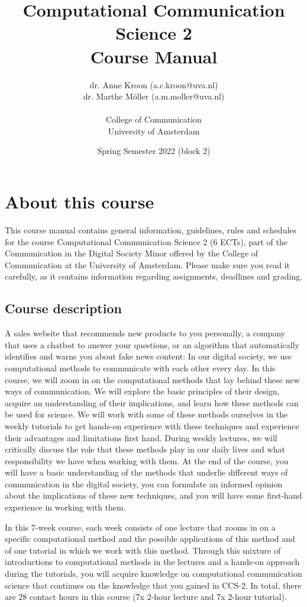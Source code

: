 \documentclass[a4paper,10pt,twocolumn]{report}
\title{Computational Communication Science 2\\ Course Manual}
\author{dr. Anne Kroon (a.c.kroon@uva.nl)\\dr. Marthe Möller (a.m.moller@uva.nl) \\~\\College of Communication\\University of Amsterdam}
\date{Spring Semester 2022 (block 2)}
\begin{document}
	\maketitle
	
	\tableofcontents

	
	\chapter{About this course}
	
	This course manual contains general information, guidelines, rules and schedules for the course Computational Communication Science 2 (6 ECTs), part of the Communication in the Digital Society Minor offered by the College of Communication at the University of Amsterdam. Please make sure you read it carefully, as it  contains information regarding assignments, deadlines and grading.
	
	\section{Course description}
	
	A sales website that recommends new products to you personally, a company that uses a chatbot to answer your questions, or an algorithm that automatically identifies and warns you about fake news content: In our digital society, we use computational methods to communicate with each other every day. In this course, we will zoom in on the computational methods that lay behind these new ways of communication. We will explore the basic principles of their design, acquire an understanding of their implications, and learn how these methods can be used for science. We will work with some of these methods ourselves in the weekly tutorials to get hands-on experience with these techniques and experience their advantages and limitations first hand. During weekly lectures, we will critically discuss the role that these methods play in our daily lives and what responsibility we have when working with them. At the end of the course, you will have a basic understanding of the methods that underlie different ways of communication in the digital society, you can formulate an informed opinion about the implications of these new techniques, and you will have some first-hand experience in working with them.
	
	In this 7-week course, each week consists of one lecture that zooms in on a specific computational method and the possible applications of this method and of one tutorial in which we work with this method. Through this mixture of introductions to computational methods in the lectures and a hands-on approach during the tutorials, you will acquire knowledge on computational communication science that continues on the knowledge that you gained in CCS-2. In total, there are 28 contact hours in this course (7x 2-hour lecture and 7x 2-hour tutorial). 
	
\end{document}
